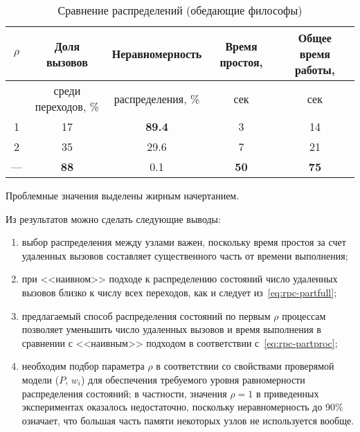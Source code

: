 \documentclass[12pt,a4paper,fleqn]{article}
\begin{document}
\begin{table}[htb]
  \centering
  \begin{tabular}{|c|c|c|c|c|}
    \hline
    $\rho$ & Доля вызовов        & Неравномерность   & Время простоя, & Общее время работы, \\ \hline
           & среди переходов, \% & распределения, \% & сек            & сек                 \\ \hline
    1      & 17                  & \textbf{89.4}     & 3              & 14                  \\ \hline
    2      & 35                  & 29.6              & 7              & 21                  \\ \hline
    ---    & \textbf{88}         & 0.1               & \textbf{50}    & \textbf{75}         \\ \hline    
  \end{tabular}
  \caption{Сравнение распределений (обедающие философы)}
  \label{tab:philo-results}
\end{table}

Проблемные значения выделены жирным начертанием. 

Из результатов можно сделать следующие выводы:

\begin{enumerate}
\item выбор распределения между узлами важен, поскольку время простоя за счет удаленных вызовов составляет существенного
  часть от времени выполнения;

\item при <<наивном>> подходе к распределению состояний число удаленных вызовов близко к числу всех переходов, как и следует
  из~\eqref{eq:rpc-partfull};

\item предлагаемый способ распределения состояний по первым $\rho$ процессам позволяет уменьшить число удаленных вызовов
  и время выполнения в сравнении с <<наивным>> подходом в соответствии с~\eqref{eq:rpc-partproc};

\item необходим подбор параметра $\rho$ в соответствии со свойствами проверямой модели ($P$, $w_i$) для обеспечения
  требуемого уровня равномерности распределения состояний; в частности, значения $\rho = 1$ в приведенных экспериментах
  оказалось недостаточно, поскольку неравномерность до 90\% означает, что большая часть памяти некоторых узлов не
  используется вообще.
\end{enumerate}
\end{document}
